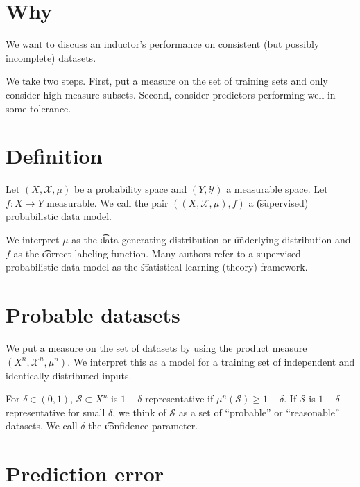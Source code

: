 

\section*{Why}

We want to discuss an inductor's performance on consistent (but possibly incomplete) datasets.

We take two steps. First, put a measure on the set of training sets and only consider high-measure subsets.
Second, consider predictors performing well in some tolerance.

\section*{Definition}

Let $(X, \mathcal{X} , \mu )$ be a probability space and $(Y, \mathcal{Y} )$ a measurable space.
Let $f: X \to Y$ measurable.
We call the pair $((X, \mathcal{X} , \mu ), f)$ a \t{(supervised) probabilistic data model}.

We interpret $\mu $ as the \t{data-generating distribution} or \t{underlying distribution} and $f$ as the \t{correct labeling function}.
Many authors refer to a supervised probabilistic data model as the \t{statistical learning (theory) framework}.

\section*{Probable datasets}

We put a measure on the set of datasets by using the product measure $(X^n, \mathcal{X} ^n, \mu ^n)$.
We interpret this as a model for a training set of independent and identically distributed inputs.


For $\delta  \in (0, 1)$, $\mathcal{S}  \subset X^n$ is \t{$1-\delta $-representative} if $\mu ^n(\mathcal{S} ) \geq 1 - \delta $.
If $\mathcal{S} $ is $1-\delta $-representative for small $\delta $, we think of $\mathcal{S} $ as a set of ``probable'' or ``reasonable'' datasets.
We call $\delta $ the \t{confidence parameter}.

\section*{Prediction error}


